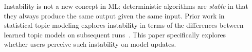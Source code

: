 Instability is not a new concept in ML; deterministic algorithms are \textit{stable} in that they always produce the same output given the same input. Prior work in statistical topic modeling explores instability in terms of the differences between learned topic models on subsequent runs~\cite{greene2014many,belford2018stability}. This paper specifically explores whether users perceive such instability on model updates.


